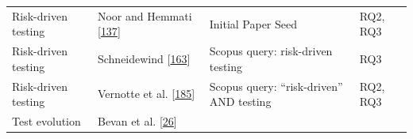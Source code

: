 \documentclass[]{book}
\begin{document}
\begin{longtable}[]{@{}llll@{}}
\begin{minipage}[t]{0.18\columnwidth}\raggedright\strut
Risk-driven testing\strut
\end{minipage} & \begin{minipage}[t]{0.16\columnwidth}\raggedright\strut
Noor and Hemmati {[}\protect\hyperlink{ref-noor2015test}{137}{]}\strut
\end{minipage} & \begin{minipage}[t]{0.50\columnwidth}\raggedright\strut
Initial Paper Seed\strut
\end{minipage} & \begin{minipage}[t]{0.04\columnwidth}\raggedright\strut
RQ2, RQ3\strut
\end{minipage}\tabularnewline
\begin{minipage}[t]{0.18\columnwidth}\raggedright\strut
Risk-driven testing\strut
\end{minipage} & \begin{minipage}[t]{0.16\columnwidth}\raggedright\strut
Schneidewind {[}\protect\hyperlink{ref-schneidewind2007}{163}{]}\strut
\end{minipage} & \begin{minipage}[t]{0.50\columnwidth}\raggedright\strut
Scopus query: risk-driven testing\strut
\end{minipage} & \begin{minipage}[t]{0.04\columnwidth}\raggedright\strut
RQ3\strut
\end{minipage}\tabularnewline
\begin{minipage}[t]{0.18\columnwidth}\raggedright\strut
Risk-driven testing\strut
\end{minipage} & \begin{minipage}[t]{0.16\columnwidth}\raggedright\strut
Vernotte et al. {[}\protect\hyperlink{ref-vernotte2015}{185}{]}\strut
\end{minipage} & \begin{minipage}[t]{0.50\columnwidth}\raggedright\strut
Scopus query: ``risk-driven'' AND testing\strut
\end{minipage} & \begin{minipage}[t]{0.04\columnwidth}\raggedright\strut
RQ2, RQ3\strut
\end{minipage}\tabularnewline
\begin{minipage}[t]{0.18\columnwidth}\raggedright\strut
Test evolution\strut
\end{minipage} & \begin{minipage}[t]{0.16\columnwidth}\raggedright\strut
Bevan et al. {[}\protect\hyperlink{ref-bevan2005}{26}{]}\strut

\end{minipage}
\end{longtable}
\end{document}
